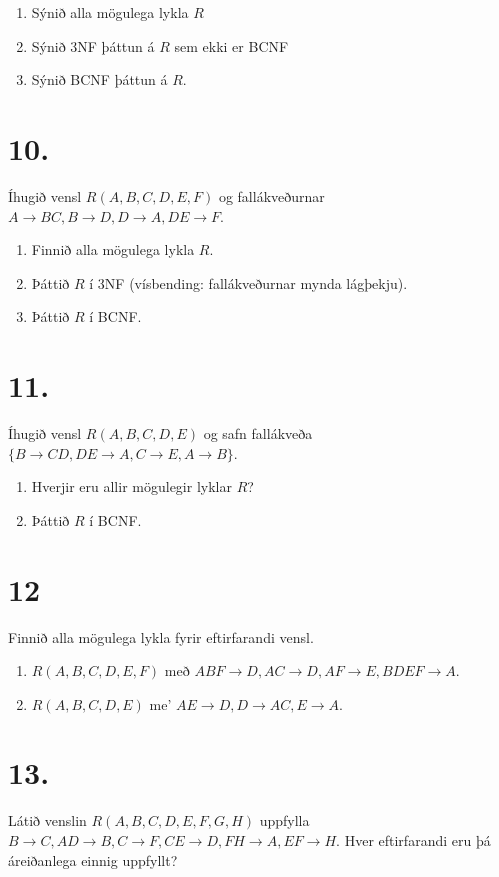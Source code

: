 \documentclass{article}
\newcommand{\enum}{\begin{enumerate}[label = \alph*.]}
\begin{document}
\enum
\item Sýnið alla mögulega lykla $R$
\item Sýnið 3NF þáttun á $R$ sem ekki er BCNF
\item Sýnið BCNF þáttun á $R$.
\end{enumerate}

\vspace{1cm}

\section{10.}
Íhugið vensl $R(A, B, C, D, E, F)$ og fallákveðurnar
$A \rightarrow BC, B \rightarrow D, D \rightarrow A, DE \rightarrow F$.

\enum
\item  Finnið alla mögulega lykla $R$.
\item  Þáttið $R$ í 3NF (vísbending: fallákveðurnar mynda lágþekju).
\item  Þáttið $R$ í BCNF. 
\end{enumerate}

\vspace{1cm}

\section{11.}
Íhugið vensl $R(A, B, C, D, E)$ og safn fallákveða
$\{B \rightarrow CD, DE \rightarrow A, C \rightarrow E, A \rightarrow B\}$.

\enum
\item Hverjir eru allir mögulegir lyklar $R$?
\item Þáttið $R$ í BCNF.
\end{enumerate}


\vspace{1cm}


\section{12}
Finnið alla mögulega lykla fyrir eftirfarandi vensl.
\enum
\item $R(A,B,C,D,E,F)$ með $ABF \rightarrow D, AC \rightarrow D, AF \rightarrow E, BDEF \rightarrow A$.
\item $R(A,B,C,D,E)$ me' $AE \rightarrow D, D \rightarrow AC, E \rightarrow A$.
\end{enumerate}

\newpage


\section{13.}
Látið venslin $R(A, B, C, D, E, F, G, H)$ uppfylla $B \rightarrow C, AD \rightarrow B, C \rightarrow
F, CE \rightarrow D, FH \rightarrow A, EF \rightarrow H$.
Hver eftirfarandi eru þá áreiðanlega einnig uppfyllt?
\end{document}
